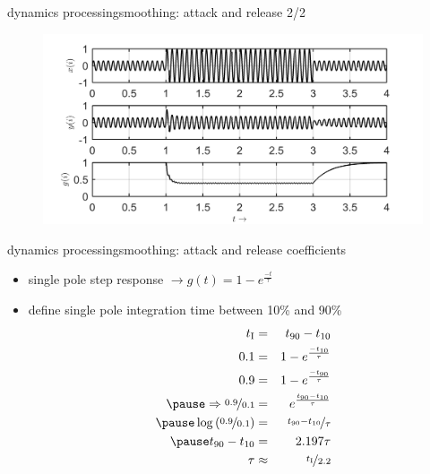 \begin{frame}{dynamics processing}{smoothing: attack and release 2/2}
	\vspace{-3mm}
    \begin{figure}
		\centering
			\includegraphics[scale=1]{graph/comp_sine}
	\end{figure}
\end{frame}

\begin{frame}{dynamics processing}{smoothing: attack and release coefficients}
    \begin{itemize}
        \item   single pole step response $\rightarrow g(t) = 1-e^{\frac{-t}{\tau}}$ 
        \pause
        \item   define single pole integration time between 10\% and 90\%
            \begin{eqnarray*}
                t_\mathrm{I} &=& t_{90} - t_{10}\\
                0.1 &=& 1 - e^{\frac{-t_{10}}{\tau}}\\
                0.9 &=& 1 - e^{\frac{-t_{90}}{\tau}}\\
        \pause
            \Rightarrow \nicefrac{0.9}{0.1} &=& e^{\frac{t_{90}-t_{10}}{\tau}}\\
        \pause
            \log\left(\nicefrac{0.9}{0.1}\right) &=& \nicefrac{t_{90}-t_{10}}{\tau}\\
        \pause
            t_{90}-t_{10} &=& 2.197\tau\\
            \tau &\approx& \nicefrac{t_\mathrm{I}}{2.2}
        \end{eqnarray*}

    \end{itemize}
\end{frame}

